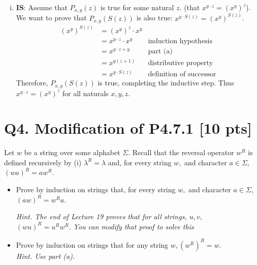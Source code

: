 \documentclass[12pt]{article}
\begin{document}
\begin{enumerate}[(a)]
\begin{enumerate}[(i)]
				\item \textbf{IS}: Assume that $P_{x,y}(z)$ is true for some natural $z$.
					(that $x^{y\cdot z}=(x^{y})^{z}$). We want to prove that $P_{x,y}(S(z))$
					is also true: $x^{y\cdot S(z)}=(x^{y})^{S(z)}$.
					\begin{align*}
						(x^{y})^{S(z)} & = (x^{y})^{z}\cdot x^{y}   \\
						               & = x^{y\cdot z}\cdot x^{y} & \text{induction hypothesis}    \\
						               & = x^{y\cdot z+y}          & \text{part (a)}                \\
						               & = x^{y(z+1)}              & \text{distributive property}   \\
						               & = x^{y\cdot S(z)}         & \text{definition of successor}
					\end{align*}
					Therefore, $P_{x,y}(S(z))$ is true, completing the inductive step.
					Thus $x^{y\cdot z}=(x^{y})^{z}$ for all naturals $x,y,z$.
			\end{enumerate}
	\end{enumerate}

	\newpage

	\section*{\textbf{Q4. Modification of P4.7.1} [10 pts]}
	Let $w$ be a string over some alphabet $\Sigma.$ Recall that the reversal operator
	$w^{R}$ is defined recursively by (i) $\lambda^{R} = \lambda$ and, for every
	string $w,$ and character $a\in \Sigma,$ $(wa)^{R} = a w^{R}.$

	\begin{itemize}
		\item[(a)] Prove by induction on strings that, for every string $w,$ and
			character $a\in \Sigma,$ $(a w)^{R} = w^{R} a.$

			{\em \small Hint. The end of Lecture 19 proves that for all {\em strings}, $u,v,$ $(wu)^{R} = u^{R} w^{R}.$ You can modify that proof to solve this}

		\item[(b)] Prove by induction on strings that for any string $w, (w^{R})^{R}
			= w$.\\
			{\em \small Hint. Use part (a). }
	\end{itemize}
\end{document}
